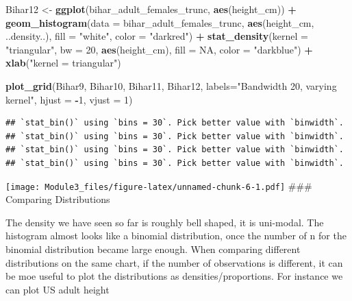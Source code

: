 \documentclass[]{book}
\newenvironment{Shaded}{\begin{snugshade}}{\end{snugshade}}
\newcommand{\KeywordTok}[1]{\textcolor[rgb]{0.13,0.29,0.53}{\textbf{#1}}}
\newcommand{\DataTypeTok}[1]{\textcolor[rgb]{0.13,0.29,0.53}{#1}}
\newcommand{\DecValTok}[1]{\textcolor[rgb]{0.00,0.00,0.81}{#1}}
\newcommand{\StringTok}[1]{\textcolor[rgb]{0.31,0.60,0.02}{#1}}
\newcommand{\OtherTok}[1]{\textcolor[rgb]{0.56,0.35,0.01}{#1}}
\newcommand{\OperatorTok}[1]{\textcolor[rgb]{0.81,0.36,0.00}{\textbf{#1}}}
\newcommand{\NormalTok}[1]{#1}
\theoremstyle{definition}
\theoremstyle{definition}
\theoremstyle{definition}
\theoremstyle{remark}
\begin{document}
\begin{Shaded}
\begin{Highlighting}[]
\NormalTok{Bihar12 <-}\StringTok{ }\KeywordTok{ggplot}\NormalTok{(bihar_adult_females_trunc, }\KeywordTok{aes}\NormalTok{(height_cm)) }\OperatorTok{+}\StringTok{ }
\StringTok{  }\KeywordTok{geom_histogram}\NormalTok{(}\DataTypeTok{data =}\NormalTok{ bihar_adult_females_trunc, }\KeywordTok{aes}\NormalTok{(height_cm, ..density..), }\DataTypeTok{fill =} \StringTok{"white"}\NormalTok{, }\DataTypeTok{color =} \StringTok{"darkred"}\NormalTok{) }\OperatorTok{+}
\StringTok{  }\KeywordTok{stat_density}\NormalTok{(}\DataTypeTok{kernel =} \StringTok{"triangular"}\NormalTok{, }\DataTypeTok{bw =} \DecValTok{20}\NormalTok{, }\KeywordTok{aes}\NormalTok{(height_cm), }\DataTypeTok{fill =} \OtherTok{NA}\NormalTok{, }\DataTypeTok{color =} \StringTok{"darkblue"}\NormalTok{) }\OperatorTok{+}
\StringTok{  }\KeywordTok{xlab}\NormalTok{(}\StringTok{"kernel = triangular"}\NormalTok{)}

\KeywordTok{plot_grid}\NormalTok{(Bihar9, Bihar10, Bihar11, Bihar12, }\DataTypeTok{labels=}\StringTok{"Bandwidth 20, varying kernel"}\NormalTok{, }\DataTypeTok{hjust =} \OperatorTok{-}\DecValTok{1}\NormalTok{, }\DataTypeTok{vjust =} \DecValTok{1}\NormalTok{)}
\end{Highlighting}
\end{Shaded}

\begin{verbatim}
## `stat_bin()` using `bins = 30`. Pick better value with `binwidth`.
## `stat_bin()` using `bins = 30`. Pick better value with `binwidth`.
## `stat_bin()` using `bins = 30`. Pick better value with `binwidth`.
## `stat_bin()` using `bins = 30`. Pick better value with `binwidth`.
\end{verbatim}

\texttt{[image: Module3\_files/figure-latex/unnamed-chunk-6-1.pdf]}
\#\#\# Comparing Distributions

The density we have seen so far is roughly bell shaped, it is uni-modal.
The histogram almost looks like a binomial distribution, once the number
of n for the binomial distribution became large enough. When comparing
different distributions on the same chart, if the number of observations
is different, it can be moe useful to plot the distributions as
densities/proportions. For instance we can plot US adult height
\end{document}
